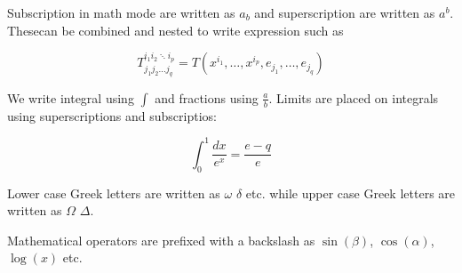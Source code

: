 \documentclass{article}
\begin{document}
Subscription in math mode are written as $a_b$ and superscription are written as $a^b$. Thesecan be
combined and nested to write expression such as

\[T^{i_1 i_2 \ddots i_p}_{j_1 j_2 \dots j_q} = T(x^{i_1},\dots,x^{i_p},e_{j_1},\dots, e_{j_q})\]

We write integral using $\int$ and fractions using $\frac{a}{b}$. Limits are placed on
integrals using superscriptions and subscriptios:

\[ \int_0^1 \frac{dx}{e^x} = \frac{e-q}{e}\]

Lower case Greek letters are written as $\omega$ $\delta$ etc. while upper case Greek
letters are written as $\Omega$ $\Delta$.

Mathematical operators are prefixed with a backslash as $\sin(\beta)$, $\cos(\alpha)$, $\log(x)$ etc.
\end{document}
